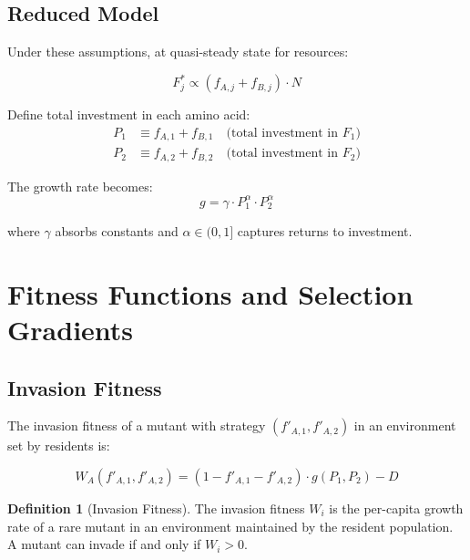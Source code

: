 \documentclass[11pt]{article}
\theoremstyle{definition}
\newtheorem{definition}{Definition}
\theoremstyle{remark}
\begin{document}
\subsection{Reduced Model}

Under these assumptions, at quasi-steady state for resources:

\begin{equation}
F_j^* \propto (f_{A,j} + f_{B,j}) \cdot N \label{eq:Fss}
\end{equation}

Define total investment in each amino acid:
\begin{align}
P_1 &\equiv f_{A,1} + f_{B,1} \quad \text{(total investment in $F_1$)}\\
P_2 &\equiv f_{A,2} + f_{B,2} \quad \text{(total investment in $F_2$)}
\end{align}

The growth rate becomes:
\begin{equation}
g = \gamma \cdot P_1^{\alpha} \cdot P_2^{\alpha} \label{eq:g_reduced}
\end{equation}

where $\gamma$ absorbs constants and $\alpha \in (0,1]$ captures returns to investment.

\section{Fitness Functions and Selection Gradients}

\subsection{Invasion Fitness}

The invasion fitness of a mutant with strategy $(f'_{A,1}, f'_{A,2})$ in an environment set by residents is:

\begin{equation}
W_A(f'_{A,1}, f'_{A,2}) = (1 - f'_{A,1} - f'_{A,2}) \cdot g(P_1, P_2) - D \label{eq:fitness}
\end{equation}

\begin{definition}[Invasion Fitness]
The invasion fitness $W_i$ is the per-capita growth rate of a rare mutant in an environment maintained by the resident population. A mutant can invade if and only if $W_i > 0$.
\end{definition}
\end{document}
